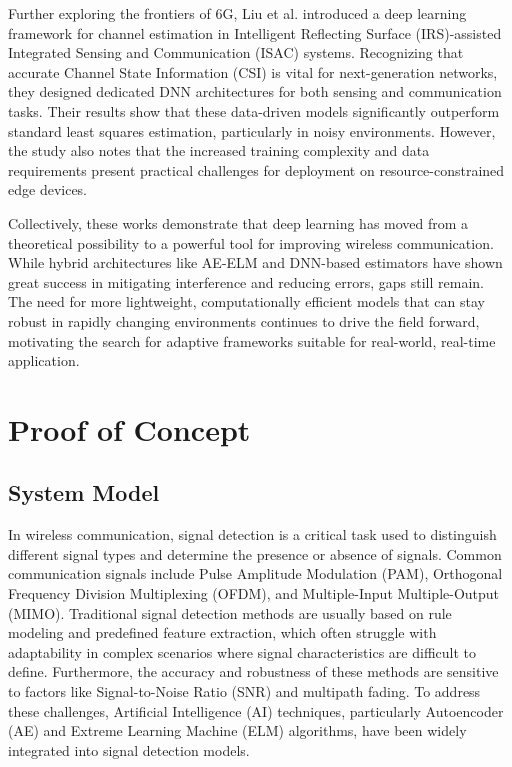 \documentclass[10pt, conference]{IEEEtran}
\begin{document}
Further exploring the frontiers of 6G, Liu et al. \cite{liu2022} introduced a deep learning framework for channel estimation in Intelligent Reflecting Surface (IRS)-assisted Integrated Sensing and Communication (ISAC) systems. Recognizing that accurate Channel State Information (CSI) is vital for next-generation networks, they designed dedicated DNN architectures for both sensing and communication tasks. Their results show that these data-driven models significantly outperform standard least squares estimation, particularly in noisy environments. However, the study also notes that the increased training complexity and data requirements present practical challenges for deployment on resource-constrained edge devices.

Collectively, these works demonstrate that deep learning has moved from a theoretical possibility to a powerful tool for improving wireless communication. While hybrid architectures like AE-ELM and DNN-based estimators have shown great success in mitigating interference and reducing errors, gaps still remain. The need for more lightweight, computationally efficient models that can stay robust in rapidly changing environments continues to drive the field forward, motivating the search for adaptive frameworks suitable for real-world, real-time application.


\section{Proof of Concept} 
\subsection{System Model}
In wireless communication, signal detection is a critical task used to distinguish different signal types and determine the presence or absence of signals. Common communication signals include Pulse Amplitude Modulation (PAM), Orthogonal Frequency Division Multiplexing (OFDM), and Multiple-Input Multiple-Output (MIMO). Traditional signal detection methods are usually based on rule modeling and predefined feature extraction, which often struggle with adaptability in complex scenarios where signal characteristics are difficult to define. Furthermore, the accuracy and robustness of these methods are sensitive to factors like Signal-to-Noise Ratio (SNR) and multipath fading. To address these challenges, Artificial Intelligence (AI) techniques, particularly Autoencoder (AE) and Extreme Learning Machine (ELM) algorithms, have been widely integrated into signal detection models.
\end{document}
